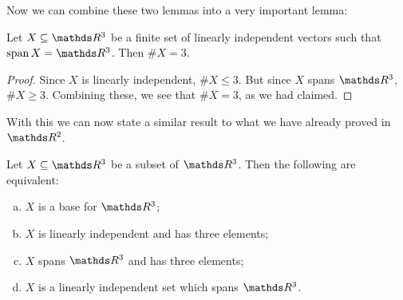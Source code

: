 Now we can combine these two lemmas into a very important lemma:

\begin{lemma}
	Let $X\subseteq\R^3$ be a finite set of linearly independent vectors such that $\spen X=\R^3$. Then $\#X=3$.
\end{lemma}
\begin{proof}
	Since $X$ is linearly independent, $\#X\leq 3$. But since $X$ spans $\R^3$, $\#X\geq 3$. Combining these, we see that $\#X=3$, as we had claimed.
\end{proof}

With this we can now state a similar result to what we have already proved in $\R^2$.

\begin{theorem}
	Let $X\subseteq\R^3$ be a subset of $\R^3$. Then the following are equivalent:
	\begin{enumerate}[a)]
		\item $X$ is a base for $\R^3$;
		\item $X$ is linearly independent and has three elements;
		\item $X$ spans $\R^3$ and has three elements;
		\item $X$ is a linearly independent set which spans $\R^3$.
	\end{enumerate}
\end{theorem}